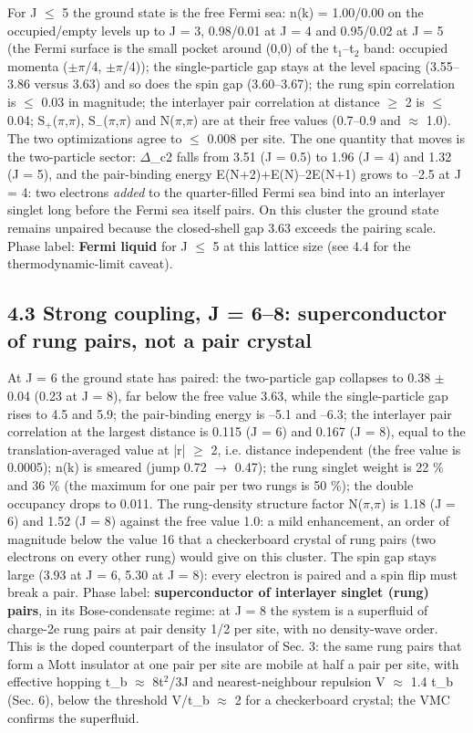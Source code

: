 \documentclass[10pt]{article}
\begin{document}
For J $\le$ 5 the ground state is the free Fermi sea: n(k) = 1.00/0.00 on the occupied/empty levels up to J = 3, 0.98/0.01 at J = 4 and 0.95/0.02 at J = 5 (the Fermi surface is the small pocket around (0,0) of the t$_1$--t$_2$ band: occupied momenta ($\pm$$\pi$/4, $\pm$$\pi$/4)); the single-particle gap stays at the level spacing (3.55--3.86 versus 3.63) and so does the spin gap (3.60--3.67); the rung spin correlation is $\le$ 0.03 in magnitude; the interlayer pair correlation at distance $\ge$ 2 is $\le$ 0.04; S$_+$($\pi$,$\pi$), S$_-$($\pi$,$\pi$) and N($\pi$,$\pi$) are at their free values (0.7--0.9 and $\approx$ 1.0). The two optimizations agree to $\le$ 0.008 per site. The one quantity that moves is the two-particle sector: $\Delta$\_c2 falls from 3.51 (J = 0.5) to 1.96 (J = 4) and 1.32 (J = 5), and the pair-binding energy E(N+2)+E(N)--2E(N+1) grows to --2.5 at J = 4: two electrons \emph{added} to the quarter-filled Fermi sea bind into an interlayer singlet long before the Fermi sea itself pairs. On this cluster the ground state remains unpaired because the closed-shell gap 3.63 exceeds the pairing scale. Phase label: \textbf{Fermi liquid} for J $\le$ 5 at this lattice size (see 4.4 for the thermodynamic-limit caveat).

\subsection*{4.3 Strong coupling, J = 6--8: superconductor of rung pairs, not a pair crystal}

At J = 6 the ground state has paired: the two-particle gap collapses to 0.38 $\pm$ 0.04 (0.23 at J = 8), far below the free value 3.63, while the single-particle gap rises to 4.5 and 5.9; the pair-binding energy is --5.1 and --6.3; the interlayer pair correlation at the largest distance is 0.115 (J = 6) and 0.167 (J = 8), equal to the translation-averaged value at |r| $\ge$ 2, i.e. distance independent (the free value is 0.0005); n(k) is smeared (jump 0.72 $\to$ 0.47); the rung singlet weight is 22 \% and 36 \% (the maximum for one pair per two rungs is 50 \%); the double occupancy drops to 0.011. The rung-density structure factor N($\pi$,$\pi$) is 1.18 (J = 6) and 1.52 (J = 8) against the free value 1.0: a mild enhancement, an order of magnitude below the value 16 that a checkerboard crystal of rung pairs (two electrons on every other rung) would give on this cluster. The spin gap stays large (3.93 at J = 6, 5.30 at J = 8): every electron is paired and a spin flip must break a pair. Phase label: \textbf{superconductor of interlayer singlet (rung) pairs}, in its Bose-condensate regime: at J = 8 the system is a superfluid of charge-2e rung pairs at pair density 1/2 per site, with no density-wave order. This is the doped counterpart of the insulator of Sec. 3: the same rung pairs that form a Mott insulator at one pair per site are mobile at half a pair per site, with effective hopping t\_b $\approx$ 8t$^2$/3J and nearest-neighbour repulsion V $\approx$ 1.4 t\_b (Sec. 6), below the threshold V/t\_b $\approx$ 2 for a checkerboard crystal; the VMC confirms the superfluid.
\end{document}
